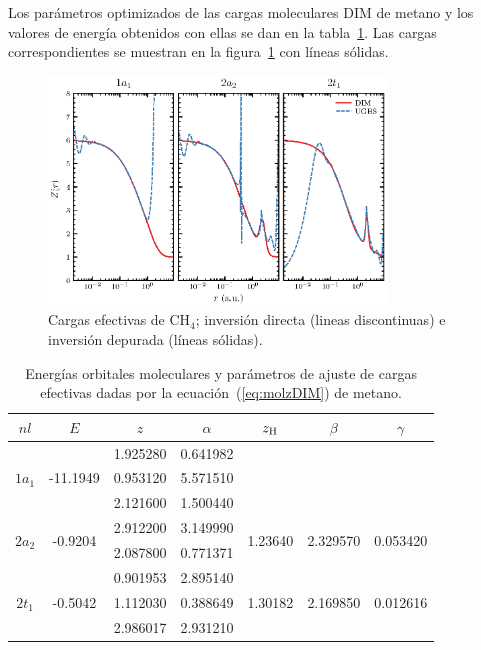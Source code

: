 Los parámetros optimizados de las cargas moleculares DIM de metano y los
valores de energía obtenidos con ellas se dan en la 
tabla~\ref{tab:ch4parameters}. Las cargas correspondientes se muestran 
en la figura~\ref{fig:ch4zeff} con líneas sólidas. 

\begin{figure}
\centering
\includegraphics[width=0.8\textwidth]{figures/dim/ch4_dim.eps}
\caption[Cargas efectivas DIM de metano.]
{Cargas efectivas de CH$_4$; inversión directa (lineas discontinuas)
e inversión depurada (líneas sólidas).}
\label{fig:ch4zeff}
\end{figure}

\begin{table}
\centering
\begin{tabular}{|c|c|c|c|c|c|c|}
\hline
   $nl$ & $E$ &$z$ & $\alpha$ & $z_{\mbox{\scriptsize H}}$ & $\beta$ & $\gamma$ \\
\hline
\hline
\multirow{3}{*}{$1a_1$} 
  & \multirow{3}{*}{-11.1949}
      & 1.925280 & 0.641982 & & & \\
    & & 0.953120 & 5.571510 & & & \\
    & & 2.121600 & 1.500440 & & & \\
\hline
\multirow{2}{*}{$2a_2$}
 & \multirow{2}{*}{-0.9204}
      & 2.912200 & 3.149990 & \multirow{2}{*}{1.23640} & \multirow{2}{*}{2.329570} & \multirow{2}{*}{0.053420} \\
    & & 2.087800 & 0.771371 & & & \\
\hline
\multirow{3}{*}{$2t_1$}
 & \multirow{3}{*}{-0.5042}
      & 0.901953 & 2.895140 & \multirow{3}{*}{1.30182} & \multirow{3}{*}{2.169850} & \multirow{3}{*}{0.012616} \\
    & & 1.112030 & 0.388649 & & & \\
    & & 2.986017 & 2.931210 & & & \\
\hline
\end{tabular}
\caption[Energías y parámetros de ajuste de cargas efectivas de metano.]
{Energías orbitales moleculares y parámetros de ajuste de cargas efectivas
dadas por la ecuación~(\ref{eq:molzDIM}) de metano.}
\label{tab:ch4parameters}
\end{table}

